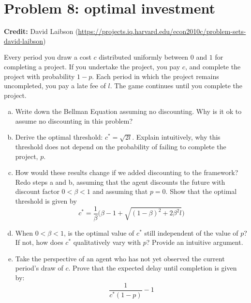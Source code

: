\documentclass[11pt]{extarticle}
\theoremstyle{plain}
\theoremstyle{definition}
\begin{document}
\vspace{10mm}
\section*{Problem 8: optimal investment}

\textbf{Credit:} David Laibson (\url{https://projects.iq.harvard.edu/econ2010c/problem-sets-david-laibson})

\vspace{5mm}
\noindent
Every period you draw a cost $c$ distributed uniformly between $0$ and $1$ for completing a project. If you undertake the project, you pay $c$, and complete the project with probability $1-p$. Each period in which the project remains uncompleted, you pay a late fee of $l$. The game continues until you complete the project.

\vspace{5mm}
\begin{enumerate}[(a)]
\item Write down the Bellman Equation assuming no discounting. Why is it ok to assume no discounting in this problem?

\item Derive the optimal threshold: $c^* = \sqrt{2l}$. Explain intuitively, why this threshold does not depend on the probability of failing to complete the project, $p$. 

\item How would these results change if we added discounting to the framework? Redo steps a and b, assuming that the agent discounts the future with discount factor $0 < \beta < 1$ and assuming that $p = 0$. Show that the optimal threshold is given by
\begin{equation*}
	c^* = \frac{1}{\beta} \bigg( \beta - 1 + \sqrt{ (1-\beta)^2 + 2 \beta^2 l } \bigg)
\end{equation*}

\item When $0 < \beta < 1$, is the optimal value of $c^*$ still independent of the value of $p$? If not, how does $c^*$ qualitatively vary with $p$? Provide an intuitive argument.

\item Take the perspective of an agent who has not yet observed the current period's draw of $c$. Prove that the expected delay until completion is given by:
\begin{equation*}
	\frac{1}{c^*(1-p)} - 1
\end{equation*}

\end{enumerate}
\end{document}
